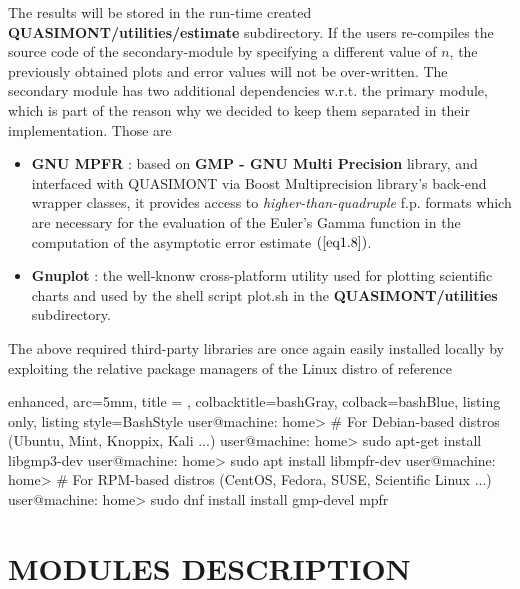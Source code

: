 \documentclass[a4paper, twosided]{book}
\begin{document}
\noindent
The results will be stored in the run-time created \colorbox{poliGrayBlue}{\textbf{QUASIMONT/utilities/estimate}} subdirectory. If the users re-compiles the source code of the secondary-module by specifying a different value of $n$, the previously obtained plots and error values will not be over-written.
The secondary module has two additional dependencies w.r.t. the primary module, which is part of the reason why we decided to keep them separated in their implementation. Those are
\begin{itemize}
    \item \color{poliDarkBlue} \textbf{GNU MPFR} \color{black}\cite{mpfr}: based on \color{poliDarkBlue} \textbf{GMP - GNU Multi Precision} \color{black} library, and interfaced with QUASIMONT via Boost Multiprecision library's back-end wrapper classes, it provides access to {\itshape higher-than-quadruple} f.p. formats which are necessary for the evaluation of the Euler's Gamma function in the computation of the asymptotic error estimate $(\ref{eq1.8})$.
    \item \color{poliDarkBlue} \textbf{Gnuplot} \color{black}: the well-knonw cross-platform utility used for plotting scientific charts and used by the shell script \colorbox{poliGrayBlue}{plot.sh} in the \colorbox{poliGrayBlue}{\textbf{QUASIMONT/utilities}} subdirectory.
\end{itemize}

\noindent
The above required third-party libraries are once again easily installed locally by exploiting the relative package managers of the Linux distro of reference

\vspace{0.5cm}
\begin{tcblisting}{enhanced,
                   arc=5mm,
                   title = \color{black}{\large \ttfamily Installation of third-party libraries for the secondary module},
                   colbacktitle=bashGray,
                   colback=bashBlue,
                   listing only,
                   listing style=BashStyle}
user@machine: home> # For Debian-based distros (Ubuntu, Mint, Knoppix, Kali ...)
user@machine: home> sudo apt-get install libgmp3-dev
user@machine: home> sudo apt install libmpfr-dev
user@machine: home> # For RPM-based distros (CentOS, Fedora, SUSE, Scientific Linux ...)
user@machine: home> sudo dnf install install gmp-devel mpfr
\end{tcblisting}
\vspace{0.5cm}

\chapter[Modules description]{\Huge \ttfamily MODULES DESCRIPTION}\label{Chap4}
\end{document}
